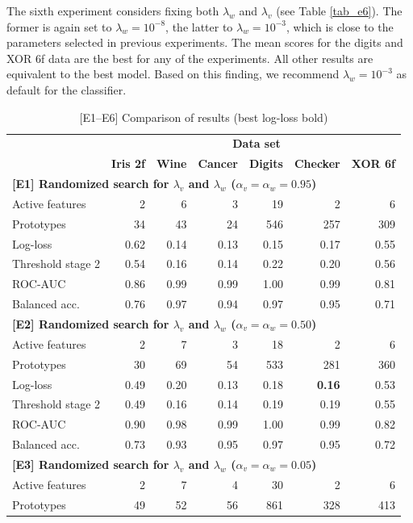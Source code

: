 %
The sixth experiment considers fixing both $\lambda_w$ and $\lambda_v$ (see Table \ref{tab_e6}).
The former is again set to $\lambda_w=10^{-8}$, the latter to $\lambda_w=10^{-3}$, which is close to the parameters selected in previous experiments.
The mean scores for the digits and XOR 6f data are the best for any of the experiments.
All other results are equivalent to the best model.
Based on this finding, we recommend $\lambda_w=10^{-3}$ as default for the classifier.\par
%
\begin{table}
\caption{[E1--E6] Comparison of results (best log-loss bold)}
\label{tab_e1_to_e6}
%
\begin{center}
\small
\begin{tabular}{|lrrrrrr|}
\hline
&\multicolumn{6}{c|}{\textbf{\hrulefill\ Data set \hrulefill}}\\
&\textbf{Iris 2f}&\textbf{Wine}&\textbf{Cancer}&\textbf{Digits}&\textbf{Checker}&\textbf{XOR 6f}\\
\multicolumn{7}{|l|}{\textbf{[E1] Randomized search for $\lambda_v$ and $\lambda_w$ ($\alpha_v=\alpha_w=0.95$)}}\\
Active features&2&6&3&19&2&6\\
Prototypes&34&43&24&546&257&309\\
Log-loss&0.62&0.14&0.13&0.15&0.17&0.55\\
Threshold stage 2&0.54&0.16&0.14&0.22&0.20&0.56\\
ROC-AUC&0.86&0.99&0.99&1.00&0.99&0.81\\
Balanced acc.&0.76&0.97&0.94&0.97&0.95&0.71\\
\multicolumn{7}{|l|}{\textbf{[E2] Randomized search for $\lambda_v$ and $\lambda_w$ ($\alpha_v=\alpha_w=0.50$)}}\\
Active features&2&7&3&18&2&6\\
Prototypes&30&69&54&533&281&360\\
Log-loss&0.49&0.20&0.13&0.18&\textbf{0.16}&0.53\\
Threshold stage 2&0.49&0.16&0.14&0.19&0.19&0.55\\
ROC-AUC&0.90&0.98&0.99&1.00&0.99&0.82\\
Balanced acc.&0.73&0.93&0.95&0.97&0.95&0.72\\
\multicolumn{7}{|l|}{\textbf{[E3] Randomized search for $\lambda_v$ and $\lambda_w$ ($\alpha_v=\alpha_w=0.05$)}}\\
Active features&2&7&4&30&2&6\\
Prototypes&49&52&56&861&328&413\\

\end{tabular}
\end{center}
\end{table}
